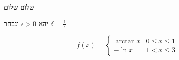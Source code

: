 \documentclass{article}
\begin{document}
שלום שלום

יהא $\epsilon >0$ ונבחר $\delta = \frac 1 \epsilon $

\[
    f(x) = \begin{cases}
        \arctan x & 0 \leq x \leq 1 \\
        -\ln x    & 1 < x \leq 3
    \end{cases}
\]
\end{document}
